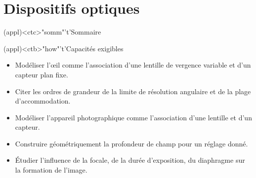 \documentclass[../../main/main.tex]{subfiles}
\begin{document}
\setcounter{chapter}{3}


\chapter{Dispositifs optiques}

\vspace*{\fill}

\begin{tcn}(appl)<ctc>"somm"'t'{Sommaire}
	\let\item\olditem
	\vspace{-15pt}
	\minitoc
	\vspace{-25pt}
\end{tcn}

\begin{tcn}[sidebyside](appl)<ctb>"how"'t'{Capacités exigibles}
	\begin{itemize}[label=\rcheck]
		\item Modéliser l'œil comme l'association d'une lentille de vergence
		      variable et d'un capteur plan fixe.
		\item Citer les ordres de grandeur de la limite de résolution angulaire et
		      de la plage d'accommodation.
		\item Modéliser l'appareil photographique comme
		      l'association d'une lentille et d'un capteur.
	\end{itemize}
	\tcblower
	\begin{itemize}[label=\rcheck]
		\item Construire géométriquement la profondeur de champ
		      pour un réglage donné.
		\item Étudier l'influence de la focale, de la durée d'exposition, du
		      diaphragme sur la formation de l'image.
	\end{itemize}
\end{tcn}

\vspace*{\fill}
\newpage
\vspace*{\fill}
\end{document}
